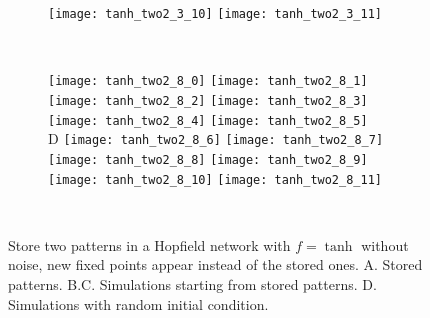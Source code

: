 \begin{figure}[H]
\begin{subfigure}{\textwidth}
      \texttt{[image: tanh\_two2\_3\_10]}
      \texttt{[image: tanh\_two2\_3\_11]}
    \end{subfigure}\\[0.6em]
    \begin{subfigure}{\textwidth}
      \hspace{2em}
      \texttt{[image: tanh\_two2\_8\_0]}
      \texttt{[image: tanh\_two2\_8\_1]}
      \texttt{[image: tanh\_two2\_8\_2]}
      \texttt{[image: tanh\_two2\_8\_3]}
      \texttt{[image: tanh\_two2\_8\_4]}
      \texttt{[image: tanh\_two2\_8\_5]}\\
      \hspace*{1em}
      \textsf{D}
      \texttt{[image: tanh\_two2\_8\_6]}
      \texttt{[image: tanh\_two2\_8\_7]}
      \texttt{[image: tanh\_two2\_8\_8]}
      \texttt{[image: tanh\_two2\_8\_9]}
      \texttt{[image: tanh\_two2\_8\_10]}
      \texttt{[image: tanh\_two2\_8\_11]}
    \end{subfigure}\\[0.6em]
  \vspace{1.2em}
  \caption{Store two patterns in a Hopfield network with $f = \tanh$ 
           without noise, new fixed points appear instead of the stored ones.
           \textsf{A.} Stored patterns.
           \textsf{B.C.} Simulations starting from stored patterns.
           \textsf{D.} Simulations with random initial condition.}
  \label{fig: Hopfield_tanh_two2}

\end{figure}

\vfill
